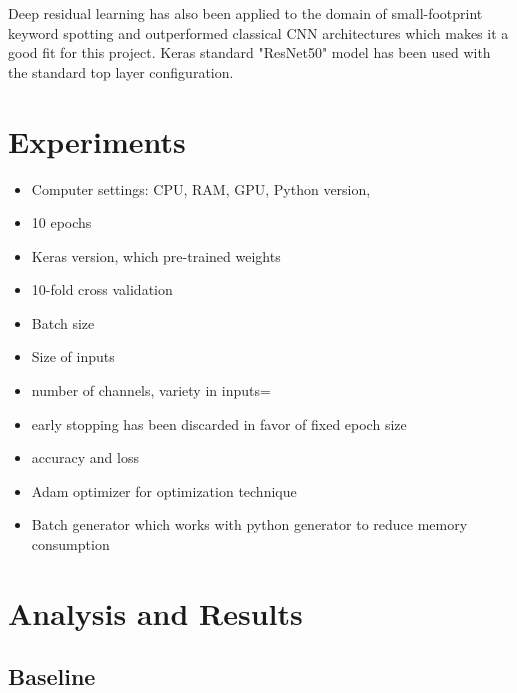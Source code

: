 \documentclass{article}
\theoremstyle{definition}
\theoremstyle{remark}
\begin{document}
Deep residual learning has also been applied to the domain of small-footprint keyword spotting and outperformed classical CNN architectures \cite{tang2018deep} which makes it a good fit for this project. Keras standard "ResNet50" model has been used with the standard top layer configuration.




\section{Experiments}


\begin{itemize}
	\item Computer settings: CPU, RAM, GPU, Python version, 
	\item 10 epochs
	\item Keras version, which pre-trained weights
	\item 10-fold cross validation
	\item Batch size
	\item Size of inputs
	\item number of channels, variety in inputs=
	\item early stopping has been discarded in favor of fixed epoch size
	\item accuracy and loss
	\item Adam optimizer for optimization technique
	\item Batch generator which works with python generator to reduce memory consumption
\end{itemize}




\section{Analysis and Results}

\subsection{Baseline}
\end{document}
